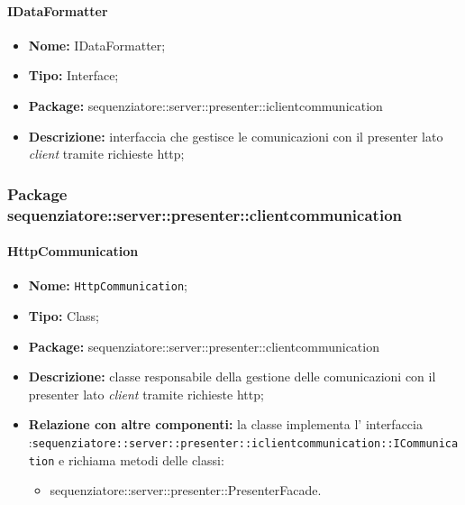 \paragraph{IDataFormatter}
	\begin{itemize}
		\item \textbf{Nome:} IDataFormatter;
		\item \textbf{Tipo:} Interface;
		\item \textbf{Package:} sequenziatore::server::presenter::iclientcommunication
		\item \textbf{Descrizione:} interfaccia che gestisce le comunicazioni con il presenter lato \textit{client} tramite richieste http;
	\end{itemize}
\subsubsection{Package sequenziatore::server::presenter::clientcommunication}
\paragraph{HttpCommunication}
	\begin{itemize}
		\item \textbf{Nome:} \texttt{HttpCommunication};
		\item \textbf{Tipo:} Class;
		\item \textbf{Package:} sequenziatore::server::presenter::clientcommunication
		\item \textbf{Descrizione:} classe responsabile della gestione delle comunicazioni con il presenter lato \textit{client} tramite richieste http;
		\item \textbf{Relazione con altre componenti:} la classe implementa l' interfaccia :\texttt{sequenziatore::server::presenter::iclientcommunication::ICommunication} e richiama metodi delle classi:
		\begin{itemize}
			\item sequenziatore::server::presenter::PresenterFacade.
		\end{itemize}
	\end{itemize}
